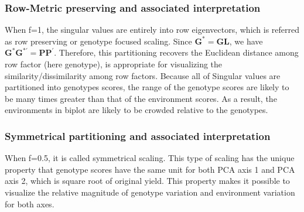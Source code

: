   \subsubsection{Row-Metric preserving and associated interpretation}
When f=1, the singular values are entirely into row eigenvectors, which is referred as row preserving or genotype focused scaling. Since $\textbf{G}^*=\textbf{GL}$, we have $\textbf{G}^*\textbf{G}^{*\prime}=\textbf{PP}^\prime$. Therefore, this partitioning recovers the Euclidean  distance among row factor (here genotype), is appropriate for visualizing the similarity/dissimilarity  among row factors. Because all of Singular values are partitioned into genotypes scores, the range of the genotype scores are likely to be many times greater than that of the environment scores. As a result, the environments in biplot are likely to be crowded relative to the genotypes. 
 \subsubsection{Symmetrical partitioning and associated interpretation}
When f=0.5, it is called symmetrical scaling. This type of scaling has the unique property that genotype scores have the same unit for both PCA axis 1 and PCA axis 2, which is square root of original yield. This property makes it possible to visualize the relative magnitude of genotype variation and environment variation for both axes.











